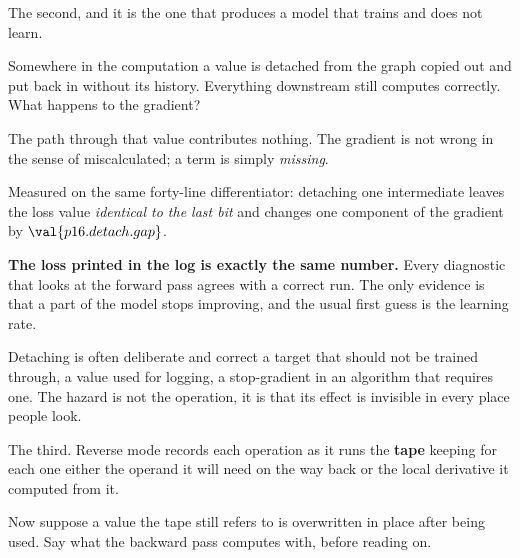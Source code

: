 \begin{fr}
The second, and it is the one that produces a model that trains and does not
learn.

Somewhere in the computation a value is detached from the graph \dash{} copied
out and put back in without its history. Everything downstream still computes
correctly. What happens to the gradient?
\nextframe
\end{fr}

\begin{fr}
\begin{ansblock}
The path through that value contributes nothing. The gradient is not wrong in
the sense of miscalculated; a term is simply \emph{missing}.
\end{ansblock}

Measured on the same forty-line differentiator: detaching one intermediate
leaves the loss value \emph{identical to the last bit} and changes one
component of the gradient by $\val{p16.detach.gap}$.

\textbf{The loss printed in the log is exactly the same number.} Every
diagnostic that looks at the forward pass agrees with a correct run. The only
evidence is that a part of the model stops improving, and the usual first
guess is the learning rate.

\begin{note}
Detaching is often deliberate and correct \dash{} a target that should not be
trained through, a value used for logging, a stop-gradient in an algorithm
that requires one. The hazard is not the operation, it is that its effect is
invisible in every place people look.
\end{note}
\end{fr}

\begin{fr}
The third. Reverse mode records each operation as it runs \dash{} the
\textbf{tape} \dash{} keeping for each one either the operand it will need on
the way back or the local derivative it computed from it.

Now suppose a value the tape still refers to is overwritten in place after
being used. Say what the backward pass computes with, before reading on.
\dotline
\nextframe
\end{fr}

